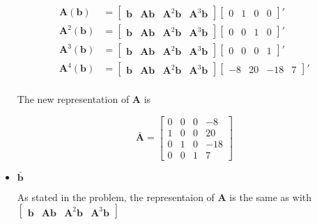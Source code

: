\begin{itemize}
\begin{align*}
 \mathbf{A} (\mathbf{b}) &= \begin{bmatrix}
                                 \mathbf{b} & \mathbf{A} \mathbf{b} & \mathbf{A}^2 \mathbf{b} & \mathbf{A}^3 \mathbf{b}
                                \end{bmatrix}
                                \begin{bmatrix}
                                 0 &1 &0&0
                                \end{bmatrix}'\\
 \mathbf{A}^2 (\mathbf{b}) &= \begin{bmatrix}
                                 \mathbf{b} & \mathbf{A} \mathbf{b} & \mathbf{A}^2 \mathbf{b} & \mathbf{A}^3 \mathbf{b}
                                \end{bmatrix}
                                \begin{bmatrix}
                                 0 &0 &1&0
                                \end{bmatrix}'\\
 \mathbf{A}^3 (\mathbf{b}) &= \begin{bmatrix}
                                 \mathbf{b} & \mathbf{A} \mathbf{b} & \mathbf{A}^2 \mathbf{b} & \mathbf{A}^3 \mathbf{b}
                                \end{bmatrix}
                                \begin{bmatrix}
                                 0 &0 &0&1
                                \end{bmatrix}'\\
 \mathbf{A}^4 (\mathbf{b}) &= \begin{bmatrix}
                                 \mathbf{b} & \mathbf{A} \mathbf{b} & \mathbf{A}^2 \mathbf{b} & \mathbf{A}^3 \mathbf{b}
                                \end{bmatrix}
                                \begin{bmatrix}
                                 -8 & 20 & -18 & 7
                                \end{bmatrix}'\\
\end{align*}

The new representation of $\mathbf{A}$ is

\begin{equation*}
 \bar{\mathbf{A}} = \begin{bmatrix}
                     0 & 0 & 0 & -8\\
                     1 & 0 & 0 & 20\\
                     0 & 1 & 0 & -18\\
                     0 & 0 & 1 & 7
                    \end{bmatrix}
\end{equation*}



 \item $\bar{\mathbf{b}}$

 As stated in the problem,
 the representaion of $\mathbf{A}$ is the same as with
 $\begin{bmatrix}
\mathbf{b} & \mathbf{A} \mathbf{b} & \mathbf{A}^2 \mathbf{b} & \mathbf{A}^3 \mathbf{b}
\end{bmatrix}$
\end{itemize}
